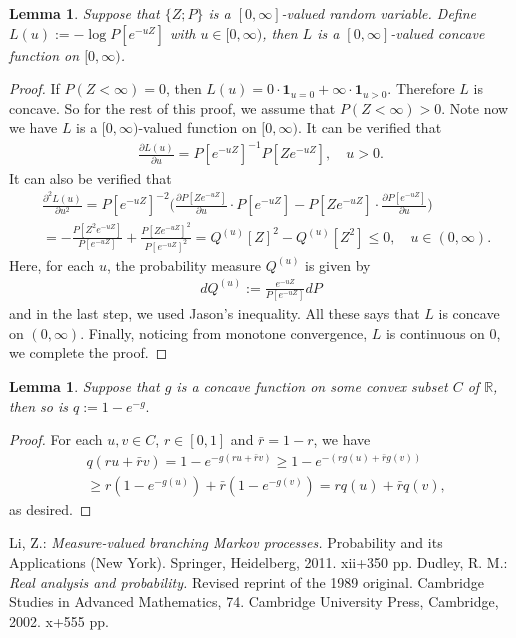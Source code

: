 \documentclass[12pt,a4paper]{amsart}
\numberwithin{equation}{section}
\theoremstyle{plain}
\newtheorem{lem}[thm]{Lemma}
\theoremstyle{definition}
\theoremstyle{remark}
\begin{document}
\begin{lem} \label{Lemma:CP!} 
Suppose that $\{Z; P\}$ is a $[0,\infty]$-valued random variable. 
Define $L(u):= - \log P[e^{- u Z}]$ with $u \in [0,\infty)$, then $L$ is a $[0,\infty]$-valued concave function on $[0,\infty)$.
\end{lem}
\begin{proof}
If $P(Z < \infty) = 0$, then $L(u) = 0\cdot \mathbf 1_{u=0} + \infty \cdot \mathbf 1_{u>0}$. 
Therefore $L$ is concave. 
So for the rest of this proof, we assume that $P(Z < \infty) > 0$. 
Note now we have $L$ is a $[0,\infty)$-valued function on $[0,\infty)$. 
It can be verified that
\begin{align}
 \frac{\partial L(u)}{\partial u} 
 = P[e^{-u Z}]^{-1} P[Ze^{- u Z}]
, \quad u > 0.
 \end{align}
It can also be verified that
\begin{align}
 & \frac{\partial^2 L(u)}{\partial u^2}
 = P[e^{-uZ}]^{-2}\Big( \frac{\partial P[Ze^{-uZ}]}{\partial u} \cdot P[e^{-uZ}] - P[Ze^{-uZ}] \cdot \frac{\partial P[e^{-uZ}]}{\partial u}\Big) 
 \\& = - \frac{P[Z^2 e^{-uZ}]}{P[e^{-uZ}]} + \frac{P[Ze^{-uZ}]^2}{P[e^{-uZ}]^2} 
 = Q^{(u)}[Z]^2 - Q^{(u)}[Z^2] 
 \leq 0, 
 \quad u \in (0,\infty).
   \end{align}
Here, for each $u$, the probability measure $Q^{(u)}$ is given by 
\begin{align}
 dQ^{(u)}
:= \frac{e^{-uZ}}{P[e^{-uZ}]} dP
 \end{align} 
and in the last step, we used Jason's inequality. 
All these says that $L$ is concave on $(0,\infty)$. 
Finally, noticing from monotone convergence, $L$ is continuous on $0$, we complete the proof.
\end{proof}
\begin{lem} \label{Lemma:CE!} 
Suppose that $g$ is a concave function on some convex subset $C$ of $\mathbb R$, then so is $q:= 1- e^{-g}.$
\end{lem}
\begin{proof}
For each $u,v \in C$, $r \in [0,1]$ and $\bar r = 1-r$, we have
\begin{align}
 &q(ru+\bar r v) 
 = 1 - e^{- g(ru + \bar r v)}
 \geq 1 - e^{- ( r g(u) + \bar r g(v))} 
 \\& \geq r(1- e^{- g(u)}) + \bar r (1 - e^{- g(v)})
 = rq(u) + \bar r q(v),
 \end{align}
as desired.
\end{proof}
\begin{thebibliography}{99}
Li, Z.:
\emph{Measure-valued branching Markov processes.}
Probability and its Applications (New York). Springer, Heidelberg, 2011. xii+350 pp.
Dudley, R. M.:
\emph{Real analysis and probability.}
Revised reprint of the 1989 original. Cambridge Studies in Advanced Mathematics, 74. Cambridge University Press, Cambridge, 2002. x+555 pp.
\end{thebibliography}
\end{document}
